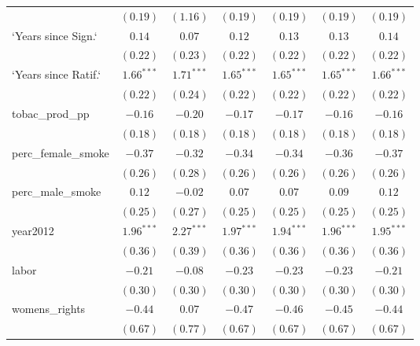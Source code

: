 \begin{table}[!h]
\begin{center}
\begin{tabular}{l c c c c c c }
                        & $(0.19)$      & $(1.16)$     & $(0.19)$      & $(0.19)$      & $(0.19)$      & $(0.19)$      \\
`Years since Sign.`     & $0.14$        & $0.07$       & $0.12$        & $0.13$        & $0.13$        & $0.14$        \\
                        & $(0.22)$      & $(0.23)$     & $(0.22)$      & $(0.22)$      & $(0.22)$      & $(0.22)$      \\
`Years since Ratif.`    & $1.66^{***}$  & $1.71^{***}$ & $1.65^{***}$  & $1.65^{***}$  & $1.65^{***}$  & $1.66^{***}$  \\
                        & $(0.22)$      & $(0.24)$     & $(0.22)$      & $(0.22)$      & $(0.22)$      & $(0.22)$      \\
tobac\_prod\_pp         & $-0.16$       & $-0.20$      & $-0.17$       & $-0.17$       & $-0.16$       & $-0.16$       \\
                        & $(0.18)$      & $(0.18)$     & $(0.18)$      & $(0.18)$      & $(0.18)$      & $(0.18)$      \\
perc\_female\_smoke     & $-0.37$       & $-0.32$      & $-0.34$       & $-0.34$       & $-0.36$       & $-0.37$       \\
                        & $(0.26)$      & $(0.28)$     & $(0.26)$      & $(0.26)$      & $(0.26)$      & $(0.26)$      \\
perc\_male\_smoke       & $0.12$        & $-0.02$      & $0.07$        & $0.07$        & $0.09$        & $0.12$        \\
                        & $(0.25)$      & $(0.27)$     & $(0.25)$      & $(0.25)$      & $(0.25)$      & $(0.25)$      \\
year2012                & $1.96^{***}$  & $2.27^{***}$ & $1.97^{***}$  & $1.94^{***}$  & $1.96^{***}$  & $1.95^{***}$  \\
                        & $(0.36)$      & $(0.39)$     & $(0.36)$      & $(0.36)$      & $(0.36)$      & $(0.36)$      \\
labor                   & $-0.21$       & $-0.08$      & $-0.23$       & $-0.23$       & $-0.23$       & $-0.21$       \\
                        & $(0.30)$      & $(0.30)$     & $(0.30)$      & $(0.30)$      & $(0.30)$      & $(0.30)$      \\
womens\_rights          & $-0.44$       & $0.07$       & $-0.47$       & $-0.46$       & $-0.45$       & $-0.44$       \\
                        & $(0.67)$      & $(0.77)$     & $(0.67)$      & $(0.67)$      & $(0.67)$      & $(0.67)$      \\

\end{tabular}
\end{center}
\end{table}

